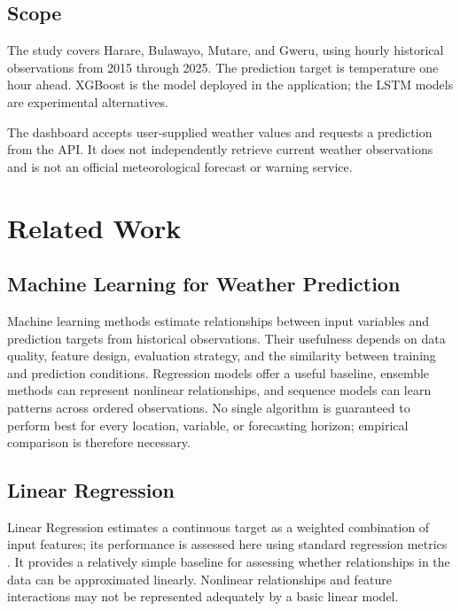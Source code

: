 \documentclass[12pt,a4paper]{article}
\begin{document}
	\subsection{Scope}
	
	The study covers Harare, Bulawayo, Mutare, and Gweru, using hourly
	historical observations from 2015 through 2025. The prediction target
	is temperature one hour ahead. XGBoost is the model deployed in the
	application; the LSTM models are experimental alternatives.
	
	The dashboard accepts user-supplied weather values and requests a
	prediction from the API. It does not independently retrieve current
	weather observations and is not an official meteorological forecast
	or warning service.
	
	\section{Related Work}
	
	\subsection{Machine Learning for Weather Prediction}
	
	Machine learning methods estimate relationships between input
	variables and prediction targets from historical observations.
	Their usefulness depends on data quality, feature design, evaluation
	strategy, and the similarity between training and prediction
	conditions. Regression models offer a useful baseline, ensemble
	methods can represent nonlinear relationships, and sequence models
	can learn patterns across ordered observations. No single algorithm
	is guaranteed to perform best for every location, variable, or
	forecasting horizon; empirical comparison is therefore necessary.
	
	\subsection{Linear Regression}
	
	Linear Regression estimates a continuous target as a weighted
	combination of input features; its performance is assessed here using
	standard regression metrics \cite{scikitlearnmetrics}. It provides a relatively simple
	baseline for assessing whether relationships in the data can be
	approximated linearly. Nonlinear relationships and feature
	interactions may not be represented adequately by a basic linear
	model.
	
\end{document}
